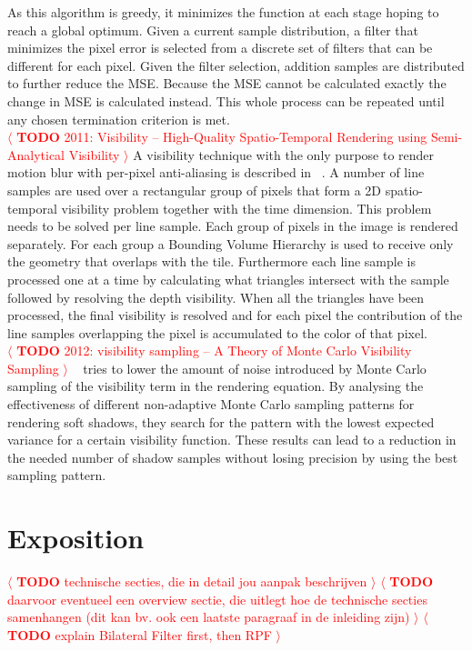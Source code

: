 \documentclass[review]{acmsiggraph}
\newcommand{\todo}[1]{\textcolor{red}{\(\langle\) \textbf{TODO} #1 \(\rangle\) }}
\begin{document}
As this algorithm is greedy, it minimizes the function at each stage hoping to reach a global optimum.
Given a current sample distribution, a filter that minimizes the pixel error is selected from a discrete set of filters that can be different for each pixel.
Given the filter selection, addition samples are distributed to further reduce the MSE.
Because the MSE cannot be calculated exactly the change in MSE is calculated instead.
This whole process can be repeated until any chosen termination criterion is met.
\\
\todo{2011: Visibility -- High-Quality Spatio-Temporal Rendering using Semi-Analytical Visibility}
A visibility technique with the only purpose to render motion blur with per-pixel anti-aliasing is described in ~\cite{Gribel2011}.
A number of line samples are used over a rectangular group of pixels that form a 2D spatio-temporal visibility problem together with the time dimension.
This problem needs to be solved per line sample.
Each group of pixels in the image is rendered separately.
For each group a Bounding Volume Hierarchy is used to receive only the geometry that overlaps with the tile. 
Furthermore each line sample is processed one at a time by calculating what triangles intersect with the sample followed by resolving the depth visibility.
When all the triangles have been processed, the final visibility is resolved and for each pixel the contribution of the line samples overlapping the pixel is accumulated to the color of that pixel.
\\
\todo{2012: visibility sampling -- A Theory of Monte Carlo Visibility Sampling}
~\cite{Ramamoorthi:2012:ATO} tries to lower the amount of noise introduced by Monte Carlo sampling of the visibility term in the rendering equation.
By analysing the effectiveness of different non-adaptive Monte Carlo sampling patterns for rendering soft shadows, 
they search for the pattern with the lowest expected variance for a certain visibility function.
These results can lead to a reduction in the needed number of shadow samples without losing precision by using the best sampling pattern.
\\


\section{Exposition}
\todo{technische secties, die in detail jou aanpak beschrijven}
\todo{daarvoor eventueel een overview sectie, die uitlegt hoe de technische
secties samenhangen (dit kan bv. ook een laatste paragraaf in de
inleiding zijn)}
\todo{explain Bilateral Filter first, then RPF}
~\cite{RPFTechReport}
\end{document}
